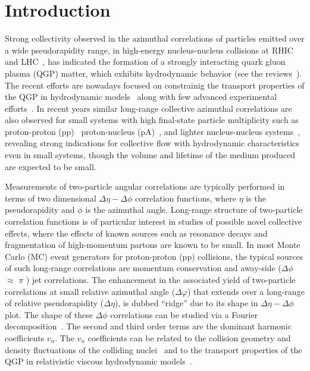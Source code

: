 
\section{Introduction}
\label{sec:intro}

Strong collectivity observed in the azimuthal correlations of particles emitted over a wide pseudorapidity range, in high-energy nucleus-nucleus collisions at RHIC~\cite{Adams:2005dq,Adcox:2004mh,Arsene:2004fa,Back:2004je} and LHC~\cite{Abelev:2012di, Abelev:2014pua, ATLAS:2011ah}, has indicated the formation of a strongly interacting quark gluon plasma (QGP) matter, which exhibits hydrodynamic behavior (see the reviews~\cite{Romatschke:2007mq,Jeon:2015dfa,Romatschke:2017ejr}). The recent efforts are nowadays focused on constrainig the transport properties of the QGP in hydrodynamic models~\cite{Niemi:2015qia,Bernhard:2016tnd,Bernhard2019} along with few advanced experimental efforts~\cite{ALICE:2016kpq,Acharya:2017gsw,Acharya:2017zfg,Acharya:2020taj}.
In recent years similar long-range collective azimuthal correlations are also observed for small systems with high final-state particle multiplicity such as proton-proton (pp)~\cite{Aad:2015gqa,Khachatryan:2015lva,Khachatryan:2016txc,Acharya:2019vdf} proton-nucleus (pA)~\cite{Abelev:2012ola,Aad:2014lta,Aaboud:2016yar,Khachatryan:2016ibd}, and lighter nucleus-nucleus systems~\cite{PHENIX:2018lia,Aidala:2017ajz}, revealing strong indications for collective flow with hydrodynamic characteristics even in small systems, though the volume and lifetime of the medium produced are expected to be small. 

Measurements of two-particle angular correlations are typically performed in terms of two dimensional $\Delta\eta-\Delta\phi$ correlation functions, where $\eta$ is the pseudorapidity and $\phi$ is the azimuthal angle. Long-range structure of two-particle correlation functions is of particular interest in studies of possible novel collective effects, where the effects of known sources such as resonance decays and fragmentation of high-momentum partons are known to be small. In most Monte Carlo (MC) event generators for proton-proton (pp) collisions, the typical sources of such long-range correlations are momentum conservation and away-side ($\Delta\phi$ $\approx$ $\pi$ ) jet correlations.
The enhancement in the associated yield of two-particle correlations at small relative azimuthal angle ($\Delta\varphi$) that extends over a long-range of relative pseudorapidity ($\Delta\eta$), is dubbed ``ridge'' due to its shape in $\Delta\eta-\Delta\phi$ plot.
The shape of these $\Delta\phi$ correlations can be studied via a Fourier decomposition~\cite{Poskanzer:1998yz,Voloshin:2008dg}. The second and third order terms are the dominant harmonic coefficients $v_n$. The $v_n$ coefficients can be related to the collision geometry and density fluctuations of the colliding nuclei~\cite{Alver:2010gr,Alver:2010dn,ALICE:2011ab} and to the transport properties of the QGP in relativistic viscous hydrodynamic models~\cite{Gale:2012rq,Niemi:2015qia,Shen:2014vra,Bernhard:2016tnd,Bernhard2019}.

